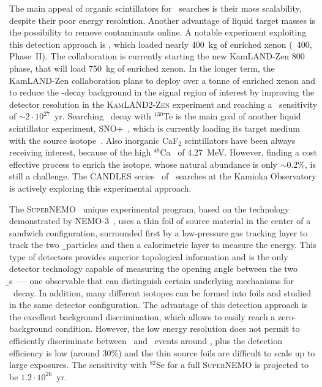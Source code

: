 \begin{description}[wide]
  \item[Scintillators] The main appeal of organic scintillators for \onbb\ searches is
    their mass scalability, despite their poor energy resolution.  Another advantage of
    liquid target masses is the possibility to remove contaminants online. A notable
    experiment exploiting this detection approach is \kamlandzen, which loaded nearly
    400~kg of enriched xenon (\kamlandzen\ 400, Phase~II). The collaboration is currently
    starting the new KamLAND-Zen 800 phase, that will load 750~kg of enriched xenon. In
    the longer term, the KamLAND-Zen collaboration plans to deploy over a tonne of
    enriched xenon and to reduce the \nnbb-decay background in the signal region of
    interest by improving the detector resolution in the \textsc{KamLAND2-Zen} experiment and
    reaching a \thalfzero\ sensitivity of ${\sim}2 \cdot 10^{27}$~yr. Searching \onbb\
    decay with $^{130}$Te is the main goal of another liquid scintillator experiment,
    SNO+~\cite{Andringa2015}, which is currently loading its target medium with the source
    isotope~\cite{Paton2019}. Also inorganic CaF$_2$ scintillators have been always
    receiving interest, because of the high $^{48}$Ca \qbb\ of 4.27~MeV. However, finding
    a cost effective process to enrich the isotope, whose natural abundance is only
    $\sim$0.2\%, is still a challenge. The CANDLES series~\cite{Umehara2015} of \onbb\
    searches at the Kamioka Observatory is actively exploring this experimental approach.

  \item[Tracking Calorimeters] The \textsc{SuperNEMO}~\cite{Arnold2010} unique
    experimental program, based on the technology demonstrated by
    NEMO-3~\cite{Arnold2004}, uses a thin foil of source material in the center of a
    sandwich configuration, surrounded first by a low-pressure gas tracking layer to track
    the two \b\ particles and then a calorimetric layer to measure the energy. This type
    of detectors provides superior topological information and is the only detector
    technology capable of measuring the opening angle between the two {\b}s~---~one
    observable that can distinguish certain underlying mechanisms for \onbb\ decay. In
    addition, many different isotopes can be formed into foils and studied in the same
    detector configuration. The advantage of this detection approach is the excellent
    background discrimination, which allows to easily reach a zero-background condition.
    However, the low energy resolution does not permit to efficiently discriminate between
    \nnbb\ and \onbb\ events around \qbb, plus the detection efficiency is low (around
    30\%) and the thin source foils are difficult to scale up to large exposures. The
    sensitivity with $^{82}$Se for a full \textsc{SuperNEMO} is projected to be $1.2 \cdot
    10^{26}$~yr.

\end{description}

